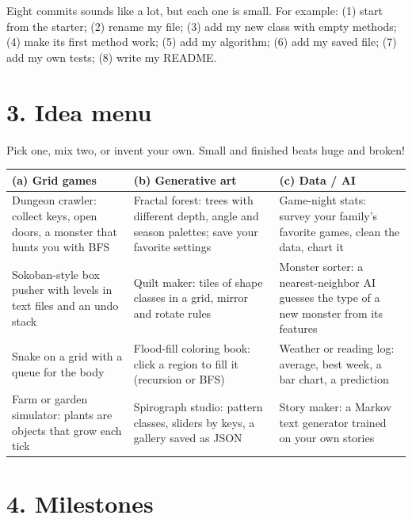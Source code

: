 \documentclass[level=3]{kidscode}
\begin{document}
\begin{tip}
Eight commits sounds like a lot, but each one is small. For example: (1) start from the starter;
(2) rename my file; (3) add my new class with empty methods; (4) make its first method work;
(5) add my algorithm; (6) add my saved file; (7) add my own tests; (8) write my README.
\end{tip}

\section{3. Idea menu}
Pick one, mix two, or invent your own. Small and finished beats huge and broken!

\begin{longtable}{@{}>{\raggedright\arraybackslash}p{}>{\raggedright\arraybackslash}p{}>{\raggedright\arraybackslash}p{}@{}}
\toprule
\rowcolor{kcaccent!15}\textbf{(a) Grid games} & \textbf{(b) Generative art} & \textbf{(c) Data / AI}\\ \midrule\endhead
\bottomrule\endfoot
Dungeon crawler: collect keys, open doors, a monster that hunts you with BFS &
Fractal forest: trees with different depth, angle and season palettes; save your favorite settings &
Game-night stats: survey your family's favorite games, clean the data, chart it\\ \midrule
Sokoban-style box pusher with levels in text files and an undo stack &
Quilt maker: tiles of shape classes in a grid, mirror and rotate rules &
Monster sorter: a nearest-neighbor AI guesses the type of a new monster from its features\\ \midrule
Snake on a grid with a queue for the body &
Flood-fill coloring book: click a region to fill it (recursion or BFS) &
Weather or reading log: average, best week, a bar chart, a prediction\\ \midrule
Farm or garden simulator: plants are objects that grow each tick &
Spirograph studio: pattern classes, sliders by keys, a gallery saved as JSON &
Story maker: a Markov text generator trained on your own stories\\
\end{longtable}

\section{4. Milestones}
\end{document}
